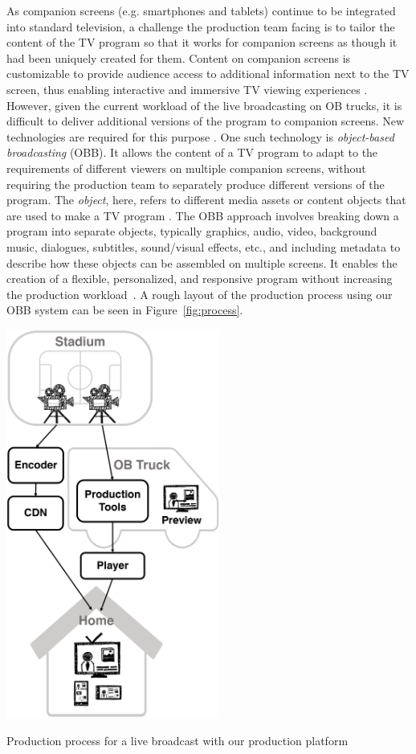 \documentclass[sigchi-a, authorversion]{acmart}
\begin{document}
As companion screens (e.g. smartphones and tablets) continue to be integrated
into standard television, a challenge the production team facing is to tailor
the content of the TV program so that it works for companion screens as though
it had been uniquely created for them. Content on companion screens is
customizable to provide audience access to additional information next to the TV
screen, thus enabling interactive and immersive TV viewing
experiences \cite{bentley2017, dowell2015}. However, given the current workload
of the live broadcasting on OB trucks, it is difficult to deliver additional
versions of the program to companion screens. New technologies are required for
this purpose \cite{Li:2018_TVX, armstrong2014}. One such technology is
\emph{object-based broadcasting} (OBB). It allows the content of a TV program to
adapt to the requirements of different viewers on multiple companion screens,
without requiring the production team to separately produce different versions
of the program. The \emph{object}, here, refers to different media assets or content
objects that are used to make a TV program \cite{armstrong2014}. The OBB approach
involves breaking down a program into separate objects, typically
graphics, audio, video, background music, dialogues, subtitles, sound/visual
effects, etc., and including metadata to describe how these objects can be
assembled on multiple screens. It enables the creation of a flexible, personalized,
and responsive program without increasing the production
workload~\cite{kegel2017, armstrong2014}. A rough layout of the production process
using our OBB system can be seen in Figure~\ref{fig:process}.

\begin{marginfigure}
    \includegraphics[width=7cm]{Figures/process.png}
    \caption{Production process for a live broadcast with our production platform}
    \label{fig:process}
\end{marginfigure}
\end{document}
